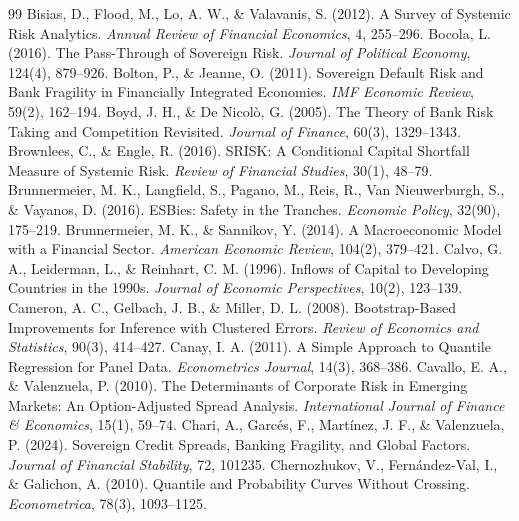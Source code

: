 \begin{thebibliography}{99}
 Bisias, D., Flood, M., Lo, A. W., \& Valavanis, S. (2012). A Survey of Systemic Risk Analytics. \textit{Annual Review of Financial Economics}, 4, 255--296.
 Bocola, L. (2016). The Pass-Through of Sovereign Risk. \textit{Journal of Political Economy}, 124(4), 879--926.
 Bolton, P., \& Jeanne, O. (2011). Sovereign Default Risk and Bank Fragility in Financially Integrated Economies. \textit{IMF Economic Review}, 59(2), 162--194.
 Boyd, J. H., \& De Nicolò, G. (2005). The Theory of Bank Risk Taking and Competition Revisited. \textit{Journal of Finance}, 60(3), 1329--1343.
 Brownlees, C., \& Engle, R. (2016). SRISK: A Conditional Capital Shortfall Measure of Systemic Risk. \textit{Review of Financial Studies}, 30(1), 48--79.
 Brunnermeier, M. K., Langfield, S., Pagano, M., Reis, R., Van Nieuwerburgh, S., \& Vayanos, D. (2016). ESBies: Safety in the Tranches. \textit{Economic Policy}, 32(90), 175--219.
 Brunnermeier, M. K., \& Sannikov, Y. (2014). A Macroeconomic Model with a Financial Sector. \textit{American Economic Review}, 104(2), 379--421.
 Calvo, G. A., Leiderman, L., \& Reinhart, C. M. (1996). Inflows of Capital to Developing Countries in the 1990s. \textit{Journal of Economic Perspectives}, 10(2), 123--139.
 Cameron, A. C., Gelbach, J. B., \& Miller, D. L. (2008). Bootstrap-Based Improvements for Inference with Clustered Errors. \textit{Review of Economics and Statistics}, 90(3), 414--427.
 Canay, I. A. (2011). A Simple Approach to Quantile Regression for Panel Data. \textit{Econometrics Journal}, 14(3), 368--386.
 Cavallo, E. A., \& Valenzuela, P. (2010). The Determinants of Corporate Risk in Emerging Markets: An Option-Adjusted Spread Analysis. \textit{International Journal of Finance \& Economics}, 15(1), 59--74.
 Chari, A., Garcés, F., Martínez, J. F., \& Valenzuela, P. (2024). Sovereign Credit Spreads, Banking Fragility, and Global Factors. \textit{Journal of Financial Stability}, 72, 101235.
 Chernozhukov, V., Fernández-Val, I., \& Galichon, A. (2010). Quantile and Probability Curves Without Crossing. \textit{Econometrica}, 78(3), 1093--1125.

\end{thebibliography}
